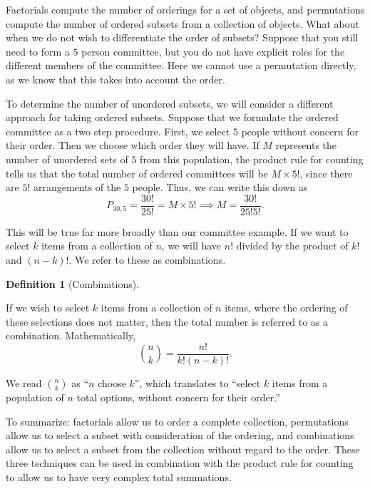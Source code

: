 \documentclass[
  letterpaper,
  DIV=11,
  numbers=noendperiod]{scrreprt}
\theoremstyle{definition}
\newtheorem{definition}{Definition}[chapter]
\theoremstyle{definition}
\theoremstyle{definition}
\theoremstyle{remark}
\begin{document}
Factorials compute the number of orderings for a set of objects, and
permutations compute the number of ordered subsets from a collection of
objects. What about when we do not wish to differentiate the order of
subsets? Suppose that you still need to form a \(5\) person committee,
but you do not have explicit roles for the different members of the
committee. Here we cannot use a permutation directly, as we know that
this takes into account the order.

To determine the number of unordered subsets, we will consider a
different approach for taking ordered subsets. Suppose that we formulate
the ordered committee as a two step procedure. First, we select \(5\)
people without concern for their order. Then we choose which order they
will have. If \(M\) represents the number of unordered sets of \(5\)
from this population, the product rule for counting tells us that the
total number of ordered committees will be \(M\times 5!\), since there
are \(5!\) arrangements of the \(5\) people. Thus, we can write this
down as
\[P_{30,5} = \frac{30!}{25!} = M\times 5! \implies M = \frac{30!}{25!5!}.\]

This will be true far more broadly than our committee example. If we
want to select \(k\) items from a collection of \(n\), we will have
\(n!\) divided by the product of \(k!\) and \((n-k)!\). We refer to
these as combinations.

\begin{definition}[Combinations]\protect\hypertarget{def-combinations}{}\label{def-combinations}

If we wish to select \(k\) items from a collection of \(n\) items, where
the ordering of these selections does not matter, then the total number
is referred to as a combination. Mathematically,
\[\binom{n}{k} = \frac{n!}{k!(n-k)!}.\]

\end{definition}

We read \(\binom{n}{k}\) as ``\(n\) choose \(k\)'', which translates to
``select \(k\) items from a population of \(n\) total options, without
concern for their order.''

To summarize: factorials allow us to order a complete collection,
permutations allow us to select a subset with consideration of the
ordering, and combinations allow us to select a subset from the
collection without regard to the order. These three techniques can be
used in combination with the product rule for counting to allow us to
have very complex total summations.
\end{document}
